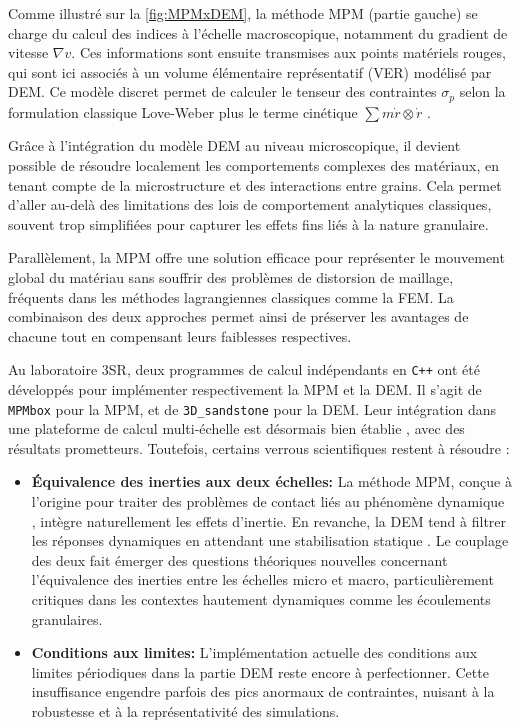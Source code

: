 \documentclass[a4paper,12pt]{report}
\begin{document}
Comme illustré sur la \autoref{fig:MPMxDEM}, la méthode MPM (partie gauche) se charge du calcul des indices à l’échelle macroscopique, notamment du gradient de vitesse $\nabla v$. Ces informations sont ensuite transmises aux points matériels rouges, qui sont ici associés à un volume élémentaire représentatif (VER) modélisé par DEM. Ce modèle discret permet de calculer le tenseur des contraintes $\sigma_p$ selon la formulation classique Love-Weber plus le terme cinétique $\sum m \dot{r} \otimes \dot{r} $ \citep{Ozenda2025Inertia}.

Grâce à l’intégration du modèle DEM au niveau microscopique, il devient possible de résoudre localement les comportements complexes des matériaux, en tenant compte de la microstructure et des interactions entre grains. Cela permet d’aller au-delà des limitations des lois de comportement analytiques classiques, souvent trop simplifiées pour capturer les effets fins liés à la nature granulaire.

Parallèlement, la MPM offre une solution efficace pour représenter le mouvement global du matériau sans souffrir des problèmes de distorsion de maillage, fréquents dans les méthodes lagrangiennes classiques comme la FEM. La combinaison des deux approches permet ainsi de préserver les avantages de chacune tout en compensant leurs faiblesses respectives.

Au laboratoire 3SR, deux programmes de calcul indépendants en \texttt{C++} ont été développés pour implémenter respectivement la MPM et la DEM. Il s'agit de \texttt{MPMbox} pour la MPM, et de \texttt{3D\_sandstone} pour la DEM. Leur intégration dans une plateforme de calcul multi-échelle est désormais bien établie  \citep{richefeu2025mpmxdem}, avec des résultats prometteurs. Toutefois, certains verrous scientifiques restent à résoudre :

\begin{itemize}
    \item \textbf{Équivalence des inerties aux deux échelles:}  
    La méthode MPM, conçue à l’origine pour traiter des problèmes de contact liés au phénomène dynamique  \citep{nguyen2023material}, intègre naturellement les effets d’inertie. En revanche, la DEM tend à filtrer les réponses dynamiques en attendant une stabilisation statique  \citep{nguyen2014fem}. Le couplage des deux fait émerger des questions théoriques nouvelles concernant l’équivalence des inerties entre les échelles micro et macro, particulièrement critiques dans les contextes hautement dynamiques comme les écoulements granulaires.

    \item \textbf{Conditions aux limites:}  
    L’implémentation actuelle des conditions aux limites périodiques dans la partie DEM reste encore à perfectionner. Cette insuffisance engendre parfois des pics anormaux de contraintes, nuisant à la robustesse et à la représentativité des simulations.
\end{itemize}
\end{document}
